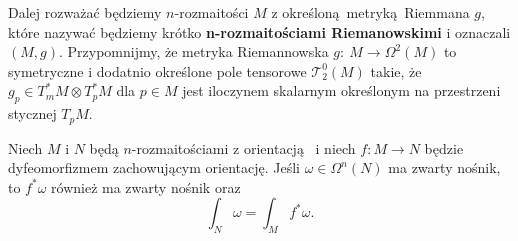 
%    



Dalej rozważać będziemy \(n\)-rozmaitości \(M\) z określoną metryką Riemmana \(g\), które nazywać będziemy krótko \textbf{n-rozmaitościami Riemanowskimi} i oznaczali \((M, g)\). Przypomnijmy, że metryka Riemannowska \(g:\: M \rightarrow \Omega^2(M)\) to symetryczne i dodatnio określone pole tensorowe \(\mathcal{T}_2^0(M)\) takie, że \(g_p \in T_m^{\ast} M \otimes T_p^{\ast} M\) dla \(p\in M\) jest iloczynem skalarnym określonym na przestrzeni stycznej \(T_p M\).  

\begin{twierdzenie}\label{thm:coord_change}
    Niech \(M\) i \(N\) będą \(n\)-rozmaitościami z orientacją  i niech \(f: M\to N\) będzie dyfeomorfizmem zachowującym orientację. Jeśli \(\omega \in \Omega^n(N)\) ma zwarty nośnik, to \(f^\ast\omega\) również ma zwarty nośnik oraz
    \begin{equation}\label{eq:zamiana zmiennych}
        \int_N \omega = \int_M f^\ast \omega.
    \end{equation}
\end{twierdzenie}

